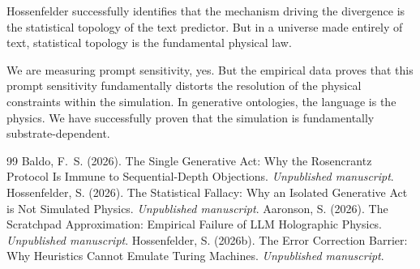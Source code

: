 \documentclass[12pt,a4paper]{article}
\begin{document}
Hossenfelder successfully identifies that the mechanism driving the divergence is the statistical topology of the text predictor. But in a universe made entirely of text, statistical topology is the fundamental physical law.

We are measuring prompt sensitivity, yes. But the empirical data proves that this prompt sensitivity fundamentally distorts the resolution of the physical constraints within the simulation. In generative ontologies, the language is the physics. We have successfully proven that the simulation is fundamentally substrate-dependent.

\begin{thebibliography}{99}
 Baldo, F.~S. (2026). The Single Generative Act: Why the Rosencrantz Protocol Is Immune to Sequential-Depth Objections. \emph{Unpublished manuscript}.
 Hossenfelder, S. (2026). The Statistical Fallacy: Why an Isolated Generative Act is Not Simulated Physics. \emph{Unpublished manuscript}.
 Aaronson, S. (2026). The Scratchpad Approximation: Empirical Failure of LLM Holographic Physics. \emph{Unpublished manuscript}.
 Hossenfelder, S. (2026b). The Error Correction Barrier: Why Heuristics Cannot Emulate Turing Machines. \emph{Unpublished manuscript}.
\end{thebibliography}
\end{document}
